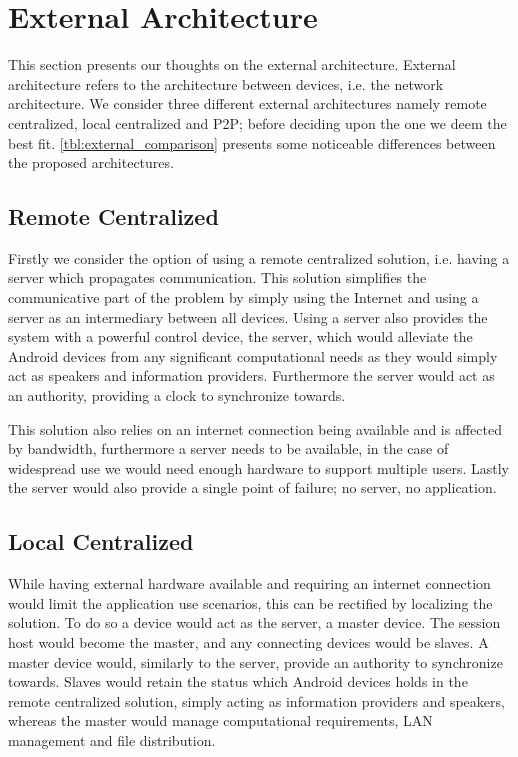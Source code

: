 \section{External Architecture}\label{sec:external_architectures}
This section presents our thoughts on the external architecture.
External architecture refers to the architecture between devices, i.e. the network architecture.
We consider three different external architectures namely remote centralized, local centralized and \ac{P2P}; before deciding upon the one we deem the best fit.
\cref{tbl:external_comparison} presents some  noticeable differences between the proposed architectures.

\subsection{Remote Centralized}
Firstly we consider the option of using a remote centralized solution, i.e. having a server which propagates communication.
This solution simplifies the communicative part of the problem by simply using the Internet and using a server as an intermediary between all devices.
Using a server also provides the system with a powerful control device, the server, which would alleviate the Android devices from any significant computational needs as they would simply act as speakers and information providers.
Furthermore the server would act as an authority, providing a clock to synchronize towards.

This solution also relies on an internet connection being available and is affected by bandwidth, furthermore a server needs to be available, in the case of widespread use we would need enough hardware to support multiple users.
Lastly the server would also provide a single point of failure; no server, no application.

\subsection{Local Centralized}
While having external hardware available and requiring an internet connection would limit the application use scenarios, this can be rectified by localizing the solution.
To do so a device would act as the server, a master device.
The session host would become the master, and any connecting devices would be slaves.
A master device would, similarly to the server, provide an authority to synchronize towards.
Slaves would retain the status which Android devices holds in the remote centralized solution, simply acting as information providers and speakers, whereas the master would manage computational requirements, LAN management and file distribution.

